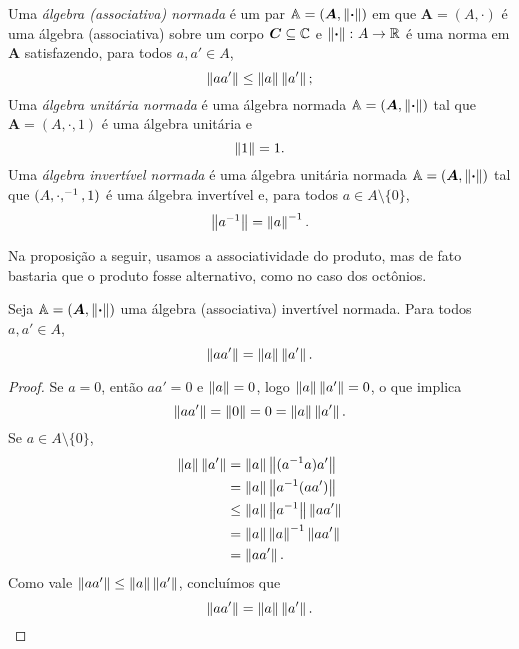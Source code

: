 \begin{definition}
Uma \emph{álgebra (associativa) normada} é um par $\mathbb A = (\bm A,\left\Vert{\bm{\cdot}}\right\Vert)$ em que $\bm A = (A,\cdot)$ é uma álgebra (associativa) sobre um corpo $\bm C \subseteq \mathbb{C}$ e $\left\Vert{\bm{\cdot}}\right\Vert\colon A \to \mathbb{R}$ é uma norma em $\bm A$ satisfazendo, para todos $a,a' \in A$,
	\begin{equation*}
	\left\Vert{aa'}\right\Vert \leq \left\Vert{a}\right\Vert\left\Vert{a'}\right\Vert;
	\end{equation*}
Uma \emph{álgebra unitária normada} é uma álgebra normada $\mathbb A = (\bm A,\left\Vert{\bm{\cdot}}\right\Vert)$ tal que $\bm A = (A,\cdot,1)$ é uma álgebra unitária e
	\begin{equation*}
	\left\Vert{1}\right\Vert = 1.
	\end{equation*}
Uma \emph{álgebra invertível normada} é uma álgebra unitária normada $\mathbb A = (\bm A,\left\Vert{\bm{\cdot}}\right\Vert)$ tal que $(A,\cdot,^{-1},1)$ é uma álgebra invertível e, para todos $a \in A \setminus \{0\}$,
	\begin{equation*}
	\left\Vert{a^{-1}}\right\Vert = \left\Vert{a}\right\Vert^{-1}.
	\end{equation*}
\end{definition}

Na proposição a seguir, usamos a associatividade do produto, mas de fato bastaria que o produto fosse alternativo, como no caso dos octônios.

\begin{exercise}
Seja $\mathbb A = (\bm A,\left\Vert{\bm{\cdot}}\right\Vert)$ uma álgebra (associativa) invertível normada. Para todos $a,a' \in A$,
	\begin{equation*}
	\left\Vert{aa'}\right\Vert = \left\Vert{a}\right\Vert\left\Vert{a'}\right\Vert.
	\end{equation*}
\end{exercise}
\begin{proof}
Se $a=0$, então $aa' = 0$ e $\left\Vert{a}\right\Vert=0$, logo $\left\Vert{a}\right\Vert\left\Vert{a'}\right\Vert=0$, o que implica
	\begin{equation*}
	\left\Vert{aa'}\right\Vert = \left\Vert{0}\right\Vert = 0 = \left\Vert{a}\right\Vert\left\Vert{a'}\right\Vert.
	\end{equation*}
Se $a \in A \setminus \{0\}$,
	\begin{align*}
	\left\Vert{a}\right\Vert\left\Vert{a'}\right\Vert &= \left\Vert{a}\right\Vert\left\Vert{(a^{-1}a)a'}\right\Vert \\
		&= \left\Vert{a}\right\Vert\left\Vert{a^{-1}(aa')}\right\Vert \\
		&\leq \left\Vert{a}\right\Vert\left\Vert{a^{-1}}\right\Vert \left\Vert{aa'}\right\Vert \\
		&= \left\Vert{a}\right\Vert\left\Vert{a}\right\Vert^{-1} \left\Vert{aa'}\right\Vert \\
		&= \left\Vert{aa'}\right\Vert.
	\end{align*}
Como vale $\left\Vert{aa'}\right\Vert \leq \left\Vert{a}\right\Vert\left\Vert{a'}\right\Vert$, concluímos que
	\begin{equation*}
	\left\Vert{aa'}\right\Vert = \left\Vert{a}\right\Vert\left\Vert{a'}\right\Vert.
	\qedhere
	\end{equation*}
\end{proof}


